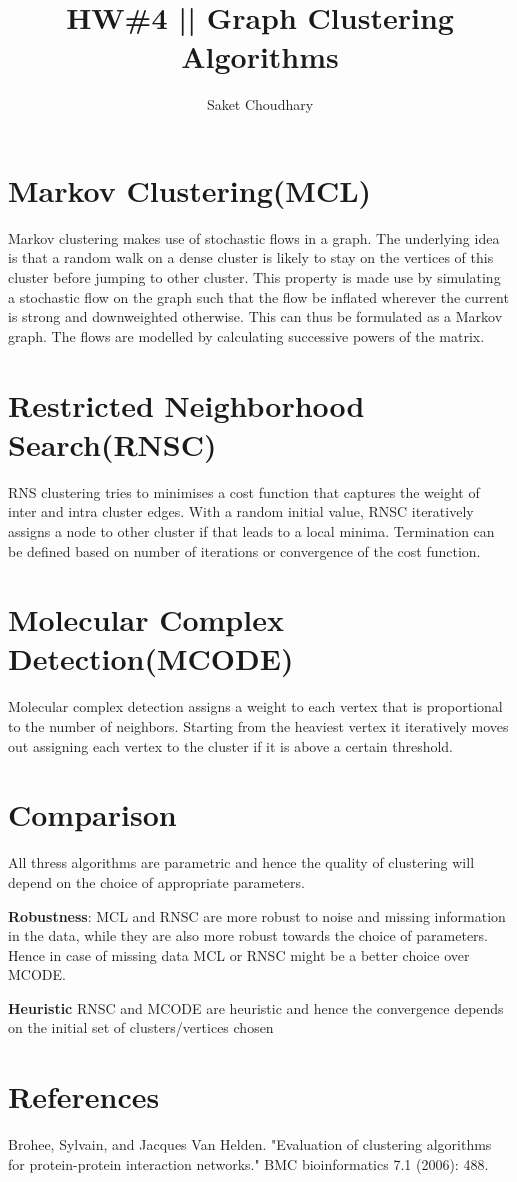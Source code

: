 \documentclass{article}
\begin{document}
	
\title{HW\#4 || Graph Clustering Algorithms}
\author{Saket Choudhary}
\maketitle

\section*{Markov Clustering(MCL)}

Markov clustering makes use of stochastic flows in a graph. The underlying idea is
that a random walk on a dense cluster is likely to stay on the vertices of this cluster before
jumping to other cluster. This property is made use by simulating a stochastic flow on the graph
such that the flow be inflated wherever the current is strong and downweighted otherwise. This can 
thus be formulated as a Markov graph. The flows are modelled by calculating successive powers of the matrix.

\section*{Restricted Neighborhood Search(RNSC)}
RNS clustering tries to minimises a cost function that captures the weight of
inter and intra cluster edges. With a random initial value, RNSC iteratively assigns
a node to other cluster if that leads to a local minima. Termination can be defined based on number of iterations
or convergence of the cost function.

\section*{Molecular Complex Detection(MCODE)}
Molecular complex detection assigns a weight to each vertex that is proportional
to the number of neighbors. Starting from the heaviest vertex it iteratively moves out
assigning each vertex to the cluster if it is above a certain threshold.
\section*{Comparison}
All thress algorithms are parametric and hence the quality of clustering will depend on the choice of appropriate parameters.

\textbf{Robustness}: MCL and RNSC are more robust to noise and missing information in the data, while they are also more robust towards the choice of parameters. Hence in case of missing data  MCL or RNSC might be a better choice over MCODE.

\textbf{Heuristic} RNSC and MCODE are heuristic and hence the convergence depends on the initial set of clusters/vertices chosen



\section*{References}
Brohee, Sylvain, and Jacques Van Helden. "Evaluation of clustering algorithms for protein-protein interaction networks." BMC bioinformatics 7.1 (2006): 488.
\end{document}
